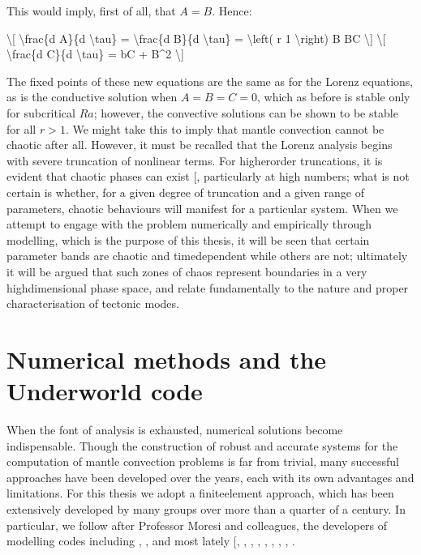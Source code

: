 \documentclass[letterpaper,10pt,english]{jupyterBook}
\begin{document}
\sphinxAtStartPar
This would imply, first of all, that \(A=B\). Hence:

\sphinxAtStartPar
\textbackslash{}{[} \textbackslash{}frac\{d A\}\{d \textbackslash{}tau\} = \textbackslash{}frac\{d B\}\{d \textbackslash{}tau\} = \textbackslash{}left( r \sphinxhyphen{} 1 \textbackslash{}right) B \sphinxhyphen{} BC \textbackslash{}{]}
\textbackslash{}{[} \textbackslash{}frac\{d C\}\{d \textbackslash{}tau\} = \sphinxhyphen{}bC + B\textasciicircum{}2 \textbackslash{}{]}

\sphinxAtStartPar
The fixed points of these new equations are the same as for the Lorenz equations, as is the conductive solution when \(A=B=C=0\), which as before is stable only for subcritical \(Ra\); however, the convective solutions can be shown to be stable for all \(r>1\). We might take this to imply that mantle convection cannot be chaotic after all. However, it must be recalled that the Lorenz analysis begins with severe truncation of non\sphinxhyphen{}linear terms. For higher\sphinxhyphen{}order truncations, it is evident that chaotic phases can exist {[}\sphinxcite{references:id89}{]}, particularly at high  numbers; what is not certain is whether, for a given degree of truncation and a given range of parameters, chaotic behaviours will manifest for a particular system. When we attempt to engage with the problem numerically and empirically through modelling, which is the purpose of this thesis, it will be seen that certain parameter bands are chaotic and time\sphinxhyphen{}dependent while others are not; ultimately it will be argued that such zones of chaos represent boundaries in a very high\sphinxhyphen{}dimensional phase space, and relate fundamentally to the nature and proper characterisation of tectonic modes.


\section{Numerical methods and the Underworld code}
\label{\detokenize{content/chapter_02_methods/section2:numerical-methods-and-the-underworld-code}}\label{\detokenize{content/chapter_02_methods/section2::doc}}
\sphinxAtStartPar
When the font of analysis is exhausted, numerical solutions become indispensable. Though the construction of robust and accurate systems for the computation of mantle convection problems is far from trivial, many successful approaches have been developed over the years, each with its own advantages and limitations. For this thesis we adopt a finite\sphinxhyphen{}element approach, which has been extensively developed by many groups over more than a quarter of a century. In particular, we follow after Professor Moresi and colleagues, the developers of modelling codes including , , and most lately  {[}, , , , , , , , \sphinxcite{references:id385}{]}.
\end{document}
